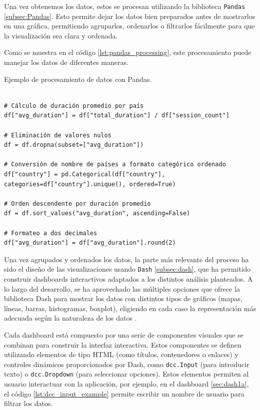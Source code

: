 \documentclass[a4paper, 12pt]{book}
\begin{document}
Una vez obtenemos los datos, estos se procesan utilizando la biblioteca \texttt{Pandas} \ref{subsec:Pandas}. Esto permite dejar los datos bien preparados antes de mostrarlos en una gráfica, permitiendo agruparlos, ordenarlos o filtrarlos fácilmente para que la visualización sea clara y ordenada.

Como se muestra en el código \ref{lst:pandas_processing}, este procesamiento puede manejar los datos de diferentes maneras.

\begin{listing}[h!]
    \caption{Ejemplo de procesamiento de datos con Pandas.}
    \label{lst:pandas_processing}
    \begin{verbatim}
    
# Cálculo de duración promedio por país
df["avg_duration"] = df["total_duration"] / df["session_count"]

# Eliminación de valores nulos
df = df.dropna(subset=["avg_duration"])

# Conversión de nombre de países a formato categórico ordenado
df["country"] = pd.Categorical(df["country"], categories=df["country"].unique(), ordered=True)

# Orden descendente por duración promedio
df = df.sort_values("avg_duration", ascending=False)

# Formateo a dos decimales 
df["avg_duration"] = df["avg_duration"].round(2)

    \end{verbatim}
\end{listing}

Una vez agrupados y ordenados los datos, la parte más relevante del proceso ha sido el diseño de las visualizaciones usando \texttt{Dash} \ref{subsec:dash}, que ha permitido construir dashboards interactivos adaptados a los distintos análisis planteados. A lo largo del desarrollo, se ha aprovechado las múltiples opciones que ofrece la biblioteca Dash para mostrar los datos con distintos tipos de gráficos (mapas, líneas, barras, histogramas, boxplot), eligiendo en cada caso la representación más adecuada según la naturaleza de los datos \cite{rGraphGallery}.

Cada dashboard está compuesto por una serie de componentes visuales que se combinan para construir la interfaz interactiva. Estos componentes se definen utilizando elementos de tipo HTML (como títulos, contenedores o enlaces) y controles dinámicos proporcionados por Dash, como \texttt{dcc.Input} (para introducir texto) o \texttt{dcc.Dropdown} (para seleccionar opciones). Estos elementos permiten al usuario interactuar con la aplicación, por ejemplo, en el dashboard \ref{sec:dash1a}, el código \ref{lst:dcc_input_example} permite escribir un nombre de usuario para filtrar los datos.
\end{document}
